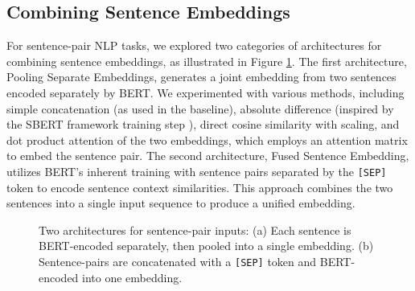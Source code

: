 \documentclass{article}
\begin{document}
\subsection{Combining Sentence Embeddings}
\label{sec:sent-pari-embed}
For sentence-pair NLP tasks,
we explored two categories of architectures for combining sentence embeddings, as illustrated 
in Figure \ref{fig:example}. The first architecture, Pooling Separate Embeddings, 
generates a joint embedding from two sentences encoded separately by BERT. We experimented 
with various methods, including simple concatenation (as used in the baseline), absolute 
difference (inspired by the SBERT framework training step \cite{reimers2019sentencebert}), 
direct cosine similarity with scaling, and dot product attention of the two embeddings, 
which employs an attention matrix to embed the sentence pair.
The second architecture, Fused Sentence Embedding, utilizes BERT's inherent training 
with sentence pairs separated by the \texttt{[SEP]} token to encode sentence context 
similarities. This approach combines the two sentences into a single input sequence to 
produce a unified embedding. 


\begin{figure}[h]%
  \centering
  \qquad
  \caption{Two architectures for sentence-pair inputs: 
  (a) Each sentence is BERT-encoded separately, then pooled into a single embedding.
  (b) Sentence-pairs are concatenated with a \texttt{[SEP]} token and BERT-encoded into 
  one embedding.
  }%
  \label{fig:example}%
\end{figure}
\end{document}
